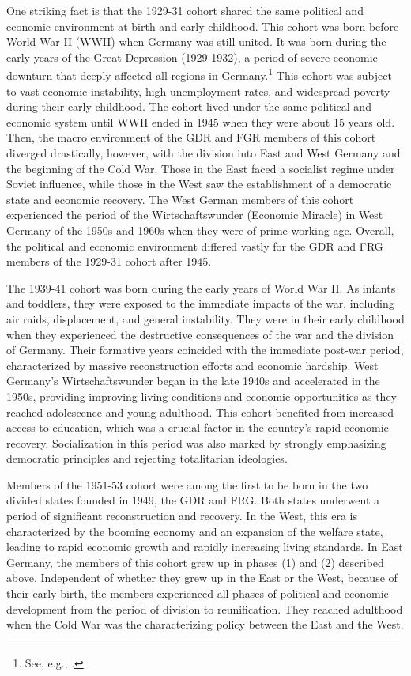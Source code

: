 \begin{Article}
\begin{refsection}[Spitz]
One striking fact is that the 1929-31 cohort shared the same political and economic environment at birth and early childhood. This cohort was born before World War II (WWII) when Germany was still united. It was born during the early years of the Great Depression (1929-1932), a period of severe economic downturn that deeply affected all regions in Germany.\footnote{See, e.g., \cite{Schnabel2004}.} This cohort was subject to vast economic instability, high unemployment rates, and widespread poverty during their early childhood. The cohort lived under the same political and economic system until WWII ended in 1945 when they were about 15 years old. Then, the macro environment of the GDR and FGR members of this cohort diverged drastically, however, with the division into East and West Germany and the beginning of the Cold War. Those in the East faced a socialist regime under Soviet influence, while those in the West saw the establishment of a democratic state and economic recovery. The West German members of this cohort experienced the period of the  Wirtschaftswunder (Economic Miracle) in West Germany of the 1950s and 1960s when they were of prime working age. Overall, the political and economic environment differed vastly for the GDR and FRG members of the 1929-31 cohort after 1945.

The 1939-41 cohort was born during the early years of World War II. As infants and toddlers, they were exposed to the immediate impacts of the war, including air raids, displacement, and general instability. They were in their early childhood when they experienced the destructive consequences of the war and the division of Germany. Their formative years coincided with the immediate post-war period, characterized by massive reconstruction efforts and economic hardship. West Germany's Wirtschaftswunder began in the late 1940s and accelerated in the 1950s, providing improving living conditions and economic opportunities as they reached adolescence and young adulthood. This cohort benefited from increased access to education, which was a crucial factor in the country's rapid economic recovery. Socialization in this period was also marked by strongly emphasizing democratic principles and rejecting totalitarian ideologies.

Members of the 1951-53 cohort were among the first to be born in the two divided states founded in 1949, the GDR and FRG. Both states underwent a period of significant reconstruction and recovery. In the West, this era is characterized by the booming economy and an expansion of the welfare state, leading to rapid economic growth and rapidly increasing living standards. In East Germany, the members of this cohort grew up in phases (1) and (2) described above. Independent of whether they grew up in the East or the West, because of their early birth, the members experienced all phases of political and economic development from the period of division to reunification. They reached adulthood when the Cold War was the characterizing policy between the East and the West. 


\end{refsection}
\end{Article}
